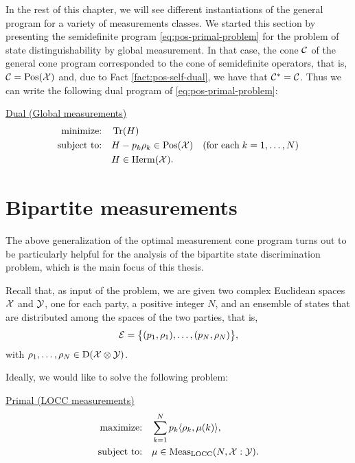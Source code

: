 In the rest of this chapter, we will see different instantiations of the general
program for a variety of measurements classes. 
We started this section by presenting the semidefinite program 
\eqref{eq:pos-primal-problem} for the problem of  
state distinguishability by global measurement. In that case, the cone $\mathcal{C}$ 
of the general cone program 
corresponded to the cone of semidefinite operators, that is, $\mathcal{C} = \mathrm{Pos}(\mathcal{X})$ and, 
due to Fact \ref{fact:pos-self-dual}, we have that $\mathcal{C}^{\ast} = \mathcal{C}$. 
Thus we can write the following dual program of \eqref{eq:pos-primal-problem}:
\begin{center}
\underline{Dual (Global measurements)}
\begin{equation}
  \label{eq:global-dual-problem}
  \begin{split}
    \text{minimize:} \quad & \operatorname{Tr}(H)\\
    \text{subject to:} \quad & H-p_k\rho_k \in \mathrm{Pos}(\mathcal{X})
    \quad(\text{for each}\;k = 1,\ldots,N)\\
    \quad & H \in \mathrm{Herm}(\mathcal{X}).
  \end{split}
\end{equation}
\end{center}


\section{Bipartite measurements}
The above generalization of the optimal measurement cone program turns out to be
particularly helpful for the analysis of the bipartite state discrimination problem,
which is the main focus of this thesis.

Recall that, as input of the problem, we are given two complex Euclidean 
spaces $\mathcal{X}$ and $\mathcal{Y}$, one for each party, a positive integer $N$, and an 
ensemble of states that are distributed among the spaces of the two parties, 
that is,
\begin{equation}
\label{eq:ensemble-bipartite}
    \mathcal{E} = \big\{ (p_{1}, \rho_{1}), \ldots, (p_{N}, \rho_{N}) \big\},
\end{equation}
with $\rho_{1}, \ldots, \rho_{N} \in \mathrm{D}(\mathcal{X}\otimes\mathcal{Y})$.

Ideally, we would like to solve the following problem:
\begin{center}
\underline{Primal (LOCC measurements)}
  \begin{equation}
    \label{eq:locc-primal-problem}
    \begin{split}
      \text{maximize:} \quad & 
        \sum_{k=1}^{N} p_{k}\ip{\rho_{k}}{\mu(k)},\\
      \text{subject to:} %
       \quad & \mu \in \Meas_{\LOCC}(N, \X:\Y).
    \end{split}
  \end{equation}
\end{center}

